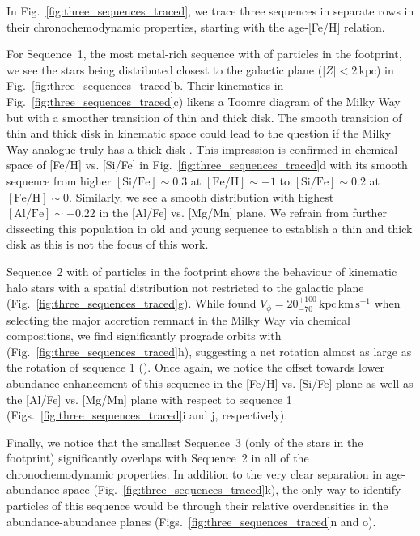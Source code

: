 \documentclass[fleqn,usenatbib]{mnras}
\begin{document}
In Fig.~\ref{fig:three_sequences_traced}, we trace three sequences in separate rows in their chronochemodynamic properties, starting with the age-[Fe/H] relation.

For Sequence~1, the most metal-rich sequence with  of particles in the footprint, we see the stars being distributed closest to the galactic plane ($\vert Z \vert < 2\,\mathrm{kpc}$) in Fig.~\ref{fig:three_sequences_traced}b. Their kinematics in Fig.~\ref{fig:three_sequences_traced}c) likens a Toomre diagram of the Milky Way  \citep[][see their Fig.~1a]{Helmi2018} but with a smoother transition of thin and thick disk. The smooth transition of thin and thick disk in kinematic space could lead to the question if the Milky Way analogue truly has a thick disk \citep[see][who raised the same question for the actual Milky Way]{Bovy2012b}. This impression is confirmed in chemical space of [Fe/H] vs. [Si/Fe] in Fig.~\ref{fig:three_sequences_traced}d with its smooth sequence from higher $\mathrm{[Si/Fe]} \sim 0.3$ at $\mathrm{[Fe/H] \sim -1}$ to $\mathrm{[Si/Fe]} \sim 0.2$ at $\mathrm{[Fe/H] \sim 0}$. Similarly, we see a smooth distribution with highest $\mathrm{[Al/Fe]} \sim -0.22$ in the [Al/Fe] vs. [Mg/Mn] plane. We refrain from further dissecting this population in old and young sequence to establish a thin and thick disk as this is not the focus of this work.

Sequence~2 with  of particles in the footprint shows the behaviour of kinematic halo stars with a spatial distribution not restricted to the galactic plane (Fig.~\ref{fig:three_sequences_traced}g). While \citet{Buder2022} found $V_\phi = {20}_{-70}^{+100}\,\mathrm{kpc\,km\,s^{-1}}$ when selecting the major accretion remnant in the Milky Way via chemical compositions, we find significantly prograde orbits with  (Fig.~\ref{fig:three_sequences_traced}h), suggesting a net rotation almost as large as the rotation of sequence 1 (). Once again, we notice the offset towards lower abundance enhancement of this sequence in the [Fe/H] vs. [Si/Fe] plane as well as the [Al/Fe] vs. [Mg/Mn] plane with respect to sequence 1 (Figs.~\ref{fig:three_sequences_traced}i and j, respectively).

Finally, we notice that the smallest Sequence~3 (only  of the stars in the footprint) significantly overlaps with Sequence~2 in all of the chronochemodynamic properties. In addition to the very clear separation in age-abundance space (Fig.~\ref{fig:three_sequences_traced}k), the only way to identify particles of this sequence would be through their relative overdensities in the abundance-abundance planes (Figs.~\ref{fig:three_sequences_traced}n and o).
\end{document}
